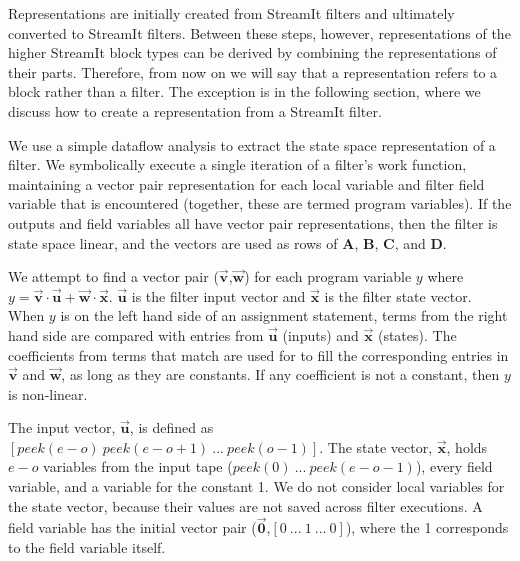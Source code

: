 Representations are initially created from StreamIt filters and
ultimately converted to StreamIt filters. Between these steps,
however, representations of the higher StreamIt block types can be
derived by combining the representations of their parts.  Therefore,
from now on we will say that a representation refers to a block rather
than a filter. The exception is in the following section, where we
discuss how to create a representation from a StreamIt filter.


We use a simple dataflow analysis to extract the state space
representation of a filter. We symbolically execute a single iteration
of a filter's work function, maintaining a vector pair representation
for each local variable and filter field variable that is encountered
(together, these are termed program variables). If the outputs and
field variables all have vector pair representations, then the filter
is state space linear, and the vectors are used as rows of
$\mathbf{A}$, $\mathbf{B}$, $\mathbf{C}$, and $\mathbf{D}$.

We attempt to find a vector pair
($\vec{\mathbf{v}}$,$\vec{\mathbf{w}}$) for each program variable $y$
where $y = \vec{\mathbf{v}} \cdot \vec{\mathbf{u}} +
\vec{\mathbf{w}} \cdot \vec{\mathbf{x}}$. $\vec{\mathbf{u}}$ is
the filter input vector and $\vec{\mathbf{x}}$ is the filter state
vector. When $y$ is on the left hand side of an assignment
statement, terms from the right hand side are compared with
entries from $\vec{\mathbf{u}}$ (inputs) and $\vec{\mathbf{x}}$
(states). The coefficients from terms that match are used for to
fill the corresponding entries in $\vec{\mathbf{v}}$ and
$\vec{\mathbf{w}}$, as long as they are constants. If any
coefficient is not a constant, then $y$ is non-linear.

The input vector, $\vec{\mathbf{u}}$, is defined as $[peek(e-o)
~peek(e-o+1) ~... ~peek(o-1)]$. The state vector,
$\vec{\mathbf{x}}$, holds $e-o$ variables from the input tape
($peek(0) ~... ~peek(e-o-1)$), every field variable, and a
variable for the constant 1. We do not consider local variables
for the state vector, because their values are not saved across
filter executions. 
A field variable has the initial vector pair ($\vec{\mathbf{0}}$,$[ 0 ~...~ 1 ~...~ 0 ]$), where the 1 corresponds to the field variable itself.

